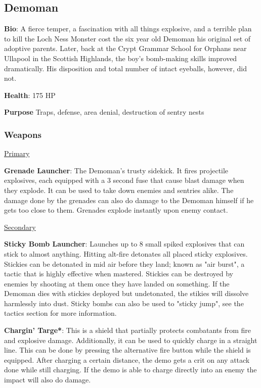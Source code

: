 \subsection{Demoman}
\label{Demoman}
{\bf Bio}:
A fierce temper, a fascination with all things explosive, and a terrible plan to kill the Loch Ness Monster cost the six year old Demoman his original set of adoptive parents. Later, back at the Crypt Grammar School for Orphans near Ullapool in the Scottish Highlands, the boy's bomb-making skills improved dramatically. His disposition and total number of intact eyeballs, however, did not.

{\bf Health}: 175 HP

{\bf Purpose}
Traps, defense, area denial, destruction of sentry nests

\subsubsection {Weapons}


\begin {center}
\underline {Primary}
\end {center}

{\bf Grenade Launcher}: The Demoman's trusty sidekick. It fires projectile explosives, each equipped with a 3 second fuse that cause blast damage when they explode. It can be used to take down enemies and sentries alike. The damage done by the grenades can also do damage to the Demoman himself if he gets too close to them. Grenades explode instantly upon enemy contact.

\begin {center}
\underline {Secondary}
\end {center}

{\bf Sticky Bomb Launcher}: Launches up to 8 small spiked explosives that can stick to almost anything. Hitting alt-fire detonates all placed sticky explosives. Stickies can be detonated in mid air before they land; known as "air burst", a tactic that is highly effective when mastered. Stickies can be destroyed by enemies by shooting at them once they have landed on something. If the Demoman dies with stickies deployed but undetonated, the stikies will dissolve harmlessly into dust. Sticky bombs can also be used to "sticky jump", see the tactics section for more information. 

{\bf Chargin' Targe*}: This is a shield that partially protects combatants from fire and explosive damage. Additionally, it can be used to quickly charge in a straight line. This can be done by pressing the alternative fire button while the shield is equipped. After charging a certain distance, the demo gets a crit on any attack done while still charging. If the demo is able to charge directly into an enemy the impact will also do damage.

